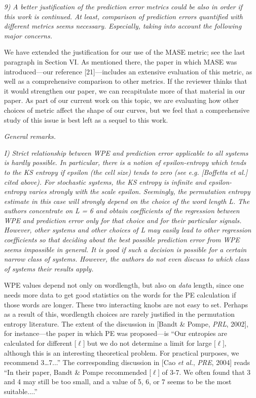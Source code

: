 \documentclass[12pt]{article}
\newcommand{\alert}[1]{{\color{red}#1}}
\begin{document}
\smallskip

\emph{9) A better justification of the prediction error metrics could
  be also in order if this work is continued. At least, comparison of
  prediction errors quantified with different metrics seems
  necessary. Especially, taking into account the following major
  concerns.}

We have extended the justification for our use of the MASE metric; see
the last paragraph in Section VI.  As mentioned there, the paper in
which MASE was introduced---\alert{our reference [21]}---includes an
extensive evaluation of this metric, as well as a comprehensive
comparison to other metrics.  If the reviewer thinks that it would
strengthen our paper, we can recapitulate more of that material in our
paper.  As part of our current work on this topic, we are evaluating
how other choices of metric affect the shape of our curves, but we
feel that a comprehensive study of this issue is best left as a sequel
to this work.

\smallskip

\noindent\emph{General remarks.}

\emph{I) Strict relationship between WPE and prediction error
  applicable to all systems is hardly possible. In particular, there
  is a notion of epsilon-entropy which tends to the KS entropy if
  epsilon (the cell size) tends to zero (see e.g.  [Boffetta et al.]
  cited above). For stochastic systems, the KS entropy is infinite and
  epsilon-entropy varies strongly with the scale epsilon. Seemingly,
  the permutation entropy estimate in this case will strongly depend
  on the choice of the word length L. The authors concentrate on L = 6
  and obtain coefficients of the regression between WPE and prediction
  error only for that choice and for their particular
  signals. However, other systems and other choices of L may easily
  lead to other regression coefficients so that deciding about the
  best possible prediction error from WPE seems impossible in
  general. It is good if such a decision is possible for a certain
  narrow class of systems. However, the authors do not even discuss to
  which class of systems their results apply.}

WPE values depend not only on wordlength, but also on \emph{data}
length, since one needs more data to get good statistics on the words
for the PE calculation if those words are longer.  These two
interacting knobs are not easy to set.  Perhaps as a result of this,
wordlength choices are rarely justified in the permutation entropy
literature.  The extent of the discussion in [Bandt \& Pompe, {\sl
    PRL}, 2002], for instance---the paper in which PE was
proposed---is ``Our entropies are calculated for different [$\ell$]
but we do not determine a limit for large [$\ell$], although this is
an interesting theoretical problem. For practical purposes, we
recommend 3\dots7...''  The corresponding discussion in [Cao {\sl et
    al.}, {\sl PRE}, 2004] reads ``In their paper, Bandt \& Pompe
recommended [$\ell$] of 3-7.  We often found that 3 and 4 may still be
too small, and a value of 5, 6, or 7 seems to be the most
suitable....''
\end{document}
